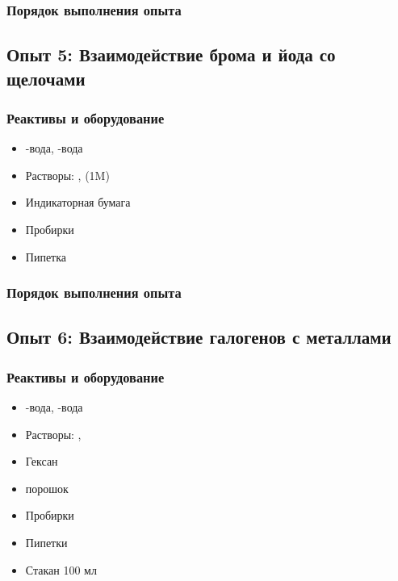 \documentclass[a4paper, 12pt]{article}
\begin{document}
\subsubsection{Порядок выполнения опыта}

\subsection{Опыт 5: Взаимодействие брома и йода со щелочами}

\subsubsection{Реактивы и оборудование}

\begin{itemize}
	\item {}-вода, -вода
	
	\item Растворы: ,  (1M)
	
	\item Индикаторная бумага
	
	\item Пробирки
	
	\item Пипетка
\end{itemize}

\subsubsection{Порядок выполнения опыта}

\subsection{Опыт 6: Взаимодействие галогенов с металлами}

\subsubsection{Реактивы и оборудование}

\begin{itemize}
	\item {}-вода, -вода
	
	\item Растворы: , 
	
	\item Гексан
	
	\item {} порошок
	
	\item Пробирки
	\item Пипетки
	\item Стакан 100 мл
\end{itemize}
\end{document}
